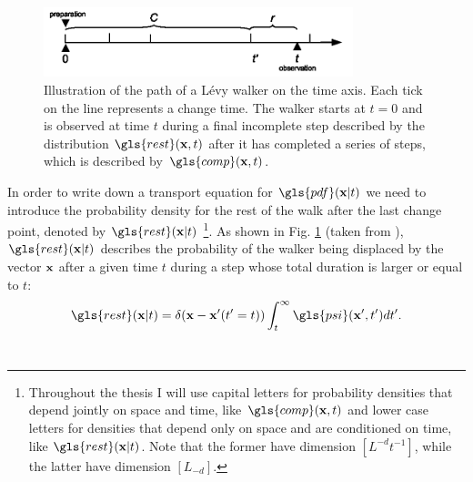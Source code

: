 \begin{figure}
\begin{center}
\includegraphics[width=90mm]{pics/timelineOrdinary.png}
\caption{Illustration of the path of a L\'evy walker on the time axis. Each tick on the line represents a change time. The walker starts at $t=0$ and is observed at time $t$ during a final incomplete step described by the distribution $\gls{rest}(\ve{x},t)$ after it has completed a series of steps, which is described by $\gls{comp}(\ve{x},t)$. 
\label{fig:pdfOrdinary}}
\end{center}
\end{figure}

In order to write down a transport equation for $\gls{pdf}(\ve{x}|t)$ we need to introduce the probability density for the rest of the walk after the last change point, denoted by $\gls{rest}(\ve{x}|t)$
\footnote{
Throughout the thesis I will use capital letters for probability densities that depend jointly on space and time, like $\gls{comp}(\ve{x},t)$ and lower case letters for densities that depend only on space and are conditioned on time, like $\gls{rest}(\ve{x}|t)$. Note that the former have dimension $[L^{-d} t^{-1}]$, while the latter have dimension $[L_{-d}]$.
}. 
As shown in Fig. \ref{fig:pdfOrdinary} (taken from \cite{bothe}), $\gls{rest}(\ve{x}|t)$ describes the probability of the walker being displaced by the vector $\mathbf{ x }$ after a given time $t$ during a step whose total duration is larger or equal to $t$:\\
%
{ \color{blue}
\begin{align}
\gls{rest}(\ve{x}|t) = \delta(\ve{x} - \ve{x}'(t'=t)) \int_{t}^{\infty} \gls{psi}(\ve{x}',t') dt' .
\end{align}
}
%
\\

